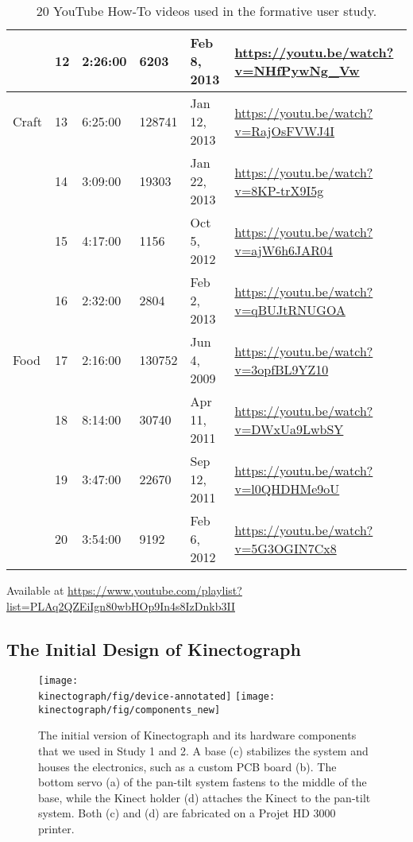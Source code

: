 \begin{appendices}
\begin{table}[h!]
\begin{minipage}[b]{1.0\textwidth}
\begin{tabular}{| l | l | l | l | l | l |}
  & 12  & 2:26:00 & 6203  & Feb 8, 2013 & \url{https://youtu.be/watch?v=NHfPywNg_Vw} \\ \hline
Craft & 13  & 6:25:00 & 128741  & Jan 12, 2013  & \url{https://youtu.be/watch?v=RajOsFVWJ4I} \\
  & 14  & 3:09:00 & 19303 & Jan 22, 2013  & \url{https://youtu.be/watch?v=8KP-trX9I5g} \\
  & 15  & 4:17:00 & 1156  & Oct 5, 2012 & \url{https://youtu.be/watch?v=ajW6h6JAR04} \\
  & 16  & 2:32:00 & 2804  & Feb 2, 2013 & \url{https://youtu.be/watch?v=qBUJtRNUGOA} \\ \hline
Food  & 17  & 2:16:00 & 130752  & Jun 4, 2009 & \url{https://youtu.be/watch?v=3opfBL9YZ10} \\
  & 18  & 8:14:00 & 30740 & Apr 11, 2011  & \url{https://youtu.be/watch?v=DWxUa9LwbSY} \\
  & 19  & 3:47:00 & 22670 & Sep 12, 2011  & \url{https://youtu.be/watch?v=l0QHDHMe9oU} \\
  & 20  & 3:54:00 & 9192  & Feb 6, 2012 & \url{https://youtu.be/watch?v=5G3OGIN7Cx8} \\ \hline
\end{tabular}
\end{minipage}

\vspace{10pt}
Available at \url{https://www.youtube.com/playlist?list=PLAq2QZEiIgn80wbHOp9In4s8IzDnkb3II}

\caption{20 YouTube How-To videos used in the formative user study.}
  \label{tab:democut_formative}
\end{table}

\clearpage


\subsection{The Initial Design of Kinectograph}

\begin{figure}[h!]
     \centering
    \texttt{[image: \\kinectograph/fig/device-annotated]}
    \texttt{[image: \\kinectograph/fig/components\_new]}
    \caption{The initial version of Kinectograph and its hardware components that we used in Study 1 and 2. A base (c) stabilizes the system and houses the electronics, such as a custom PCB board (b). The bottom servo (a) of the pan-tilt system fastens to the middle of the base, while the Kinect holder (d) attaches the Kinect to the pan-tilt system. Both (c) and (d) are fabricated on a Projet HD 3000 printer.}
    \label{fig:kinectograph_original_design}
 \end{figure}


\end{appendices}
